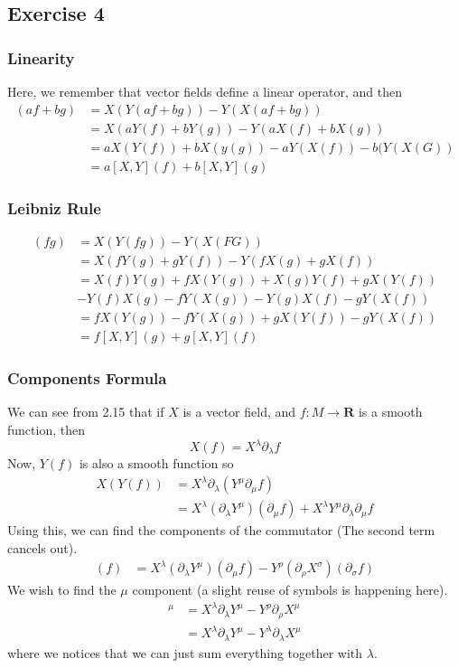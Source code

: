 \subsection{Exercise 4}
\subsubsection{Linearity}
Here, we remember that vector fields define a linear operator, and then
\begin{align}
    [X,Y](af+bg)&=X(Y(af+bg))-Y(X(af+bg)) \\
    &= X(aY(f)+bY(g)) - Y(aX(f)+bX(g)) \\
    &= aX(Y(f))+bX(y(g)) - aY(X(f)) - b(Y(X(G)) \\
    &= a[X,Y](f)+b[X,Y](g)
\end{align}
\subsubsection{Leibniz Rule}
\begin{align}
    [X,Y](fg) &= X(Y(fg)) - Y(X(FG)) \\
    &= X(fY(g) + gY(f)) - Y(fX(g)+gX(f)) \\
    &= X(f)Y(g) + fX(Y(g)) + X(g)Y(f) + gX(Y(f)) \\
    &- Y(f)X(g) - fY(X(g)) - Y(g)X(f)-gY(X(f)) \\
    &=fX(Y(g))- fY(X(g)) + gX(Y(f)) -gY(X(f)) \\
    &= f[X,Y](g) + g[X,Y](f)
\end{align}
\subsubsection{Components Formula}
We can see from 2.15 that if $X$ is a vector field, and $f:M \rightarrow \mathbf{R}$ is a smooth function, then
\begin{equation}
    X(f)=X^\lambda \partial_\lambda f
\end{equation}
Now, $Y(f)$ is also a smooth function so
\begin{align}
    X(Y(f)) &= X^\lambda \partial_\lambda (Y^\mu \partial_\mu f) \\
    &= X^\lambda (\partial_\lambda Y^\mu)( \partial_\mu f) + X^\lambda  Y^\mu \partial_\lambda \partial_\mu f
\end{align}
Using this, we can find the components of the commutator (The second term cancels out).
\begin{align}
    [X,Y](f) &= X^\lambda (\partial_\lambda Y^\mu)( \partial_\mu f) - Y^\rho (\partial_\rho X^\sigma)( \partial_\sigma f)
\end{align}
We wish to find the $\mu$ component (a slight reuse of symbols is happening here).
\begin{align}
    [X,Y]^\mu &= X^\lambda \partial_\lambda Y^\mu - Y^\rho\partial_\rho X^\mu \\
    &= X^\lambda \partial_\lambda Y^\mu - Y^\lambda\partial_\lambda X^\mu
\end{align}
where we notices that we can just sum everything together with $\lambda$.
